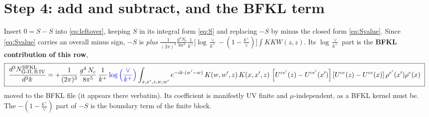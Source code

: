 \documentclass[10pt]{article}
\begin{document}
\section{Step 4: add and subtract, and the BFKL term}
Insert $0=S-S$ into \eqref{eq:leftover}, keeping $S$ in its integral form \eqref{eq:S} and
replacing $-S$ by minus the closed form \eqref{eq:Svalue}. Since \eqref{eq:Svalue} carries an
overall minus sign, $-S$ is \emph{plus}
$\frac{1}{(2\pi)^{3}}\frac{g^{4}N_{c}}{8\pi^{5}}\frac{1}{k^{+}}
\big[\log\frac{\vee}{k^{+}}-(1-\frac{k^{+}}{\vee})\big]\int KKW(z,z)$. Its
$\log\frac{\vee}{k^{+}}$ part is the \textbf{BFKL contribution of this row},
\begin{align}\label{eq:bfkl}
\boxed{\;\frac{d^{3}N^{\rm BFKL}_{\rm G\text{-}II,\,R\,IV}}{d^{3}k} = +\frac{1}{(2\pi)^{3}}\,\frac{g^{4}\,N_{c}}{8\pi^{5}}\,\frac{1}{k^{+}}\,{\color{blue}\log\Big(\frac{\vee}{k^{+}}\Big)}\int_{x,x',z,w,w'}e^{-ik\cdot (w'-w)}\,K(w,w',z)\,K(x,x',z)\,
\left[U^{ce'}(z) - U^{ce'}(x')\right]\left[U^{ce}(z) - U^{ce}(x)\right]\rho^{e'}(x')\rho^{e}(x)\;}
\end{align}
moved to the BFKL file (it appears there verbatim). Its coefficient is manifestly UV finite and
$\mu$-independent, as a BFKL kernel must be. The $-(1-\frac{k^{+}}{\vee})$ part of $-S$ is the
boundary term of the finite block.
\end{document}
